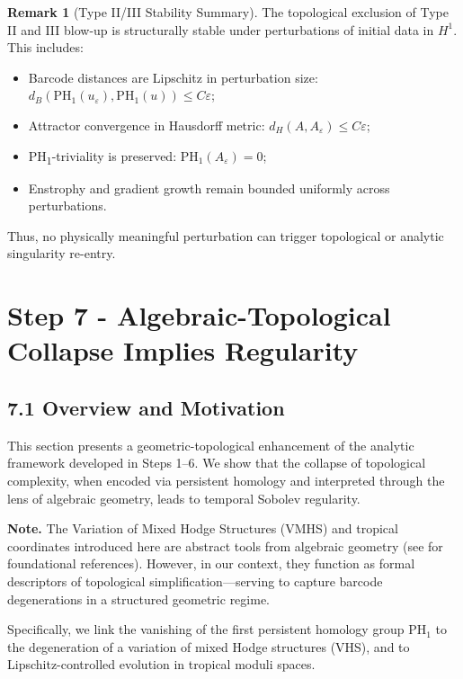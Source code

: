 \documentclass[11pt]{article}
\theoremstyle{definition}
\newtheorem{remark}[theorem]{Remark}
\begin{document}
\begin{remark}[Type II/III Stability Summary]
The topological exclusion of Type II and III blow-up is structurally stable under perturbations of initial data in $H^1$. This includes:
\begin{itemize}
    \item Barcode distances are Lipschitz in perturbation size: $d_B(\mathrm{PH}_1(u_\varepsilon), \mathrm{PH}_1(u)) \le C \varepsilon$;
    \item Attractor convergence in Hausdorff metric: $d_H(A, A_\varepsilon) \le C \varepsilon$;
    \item PH\textsubscript{1}-triviality is preserved: $\mathrm{PH}_1(A_\varepsilon) = 0$;
    \item Enstrophy and gradient growth remain bounded uniformly across perturbations.
\end{itemize}
Thus, no physically meaningful perturbation can trigger topological or analytic singularity re-entry.
\end{remark}



\section{Step 7 - Algebraic-Topological Collapse Implies Regularity}

\subsection*{7.1 Overview and Motivation}

This section presents a geometric-topological enhancement of the analytic framework developed in Steps 1–6. We show that the collapse of topological complexity, when encoded via persistent homology and interpreted through the lens of algebraic geometry, leads to temporal Sobolev regularity.

\textbf{Note.} The Variation of Mixed Hodge Structures (VMHS) and tropical coordinates introduced here are abstract tools from algebraic geometry (see \cite{griffiths_harris, mikhalkin_tropical} for foundational references). However, in our context, they function as formal descriptors of topological simplification---serving to capture barcode degenerations in a structured geometric regime.

Specifically, we link the vanishing of the first persistent homology group $\mathrm{PH}_1$ to the degeneration of a variation of mixed Hodge structures (VHS), and to Lipschitz-controlled evolution in tropical moduli spaces.
\end{document}
